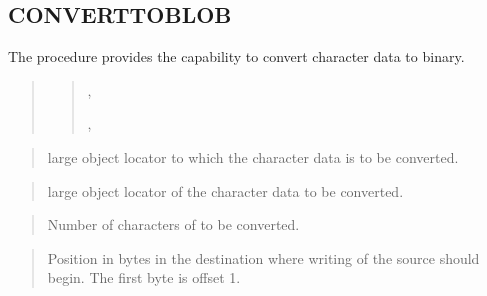 \documentclass[letterpaper,10pt,english,openany,oneside]{sphinxmanual}
\begin{document}
\newpage


\subsection{CONVERTTOBLOB}
\label{\detokenize{converttoblob::doc}}\label{\detokenize{converttoblob:converttoblob}}
The  procedure provides the capability to convert character
data to binary.
\begin{quote}

\begin{quote}

,

,

\end{quote}
\end{quote}


\begin{quote}

 large object locator to which the character data is to be
converted.
\end{quote}

\begin{quote}

 large object locator of the character data to be converted.
\end{quote}

\begin{quote}

Number of characters of  to be converted.
\end{quote}

\begin{quote}

Position in bytes in the destination  where writing of the source
 should begin. The first byte is offset 1.
\end{quote}
\end{document}
